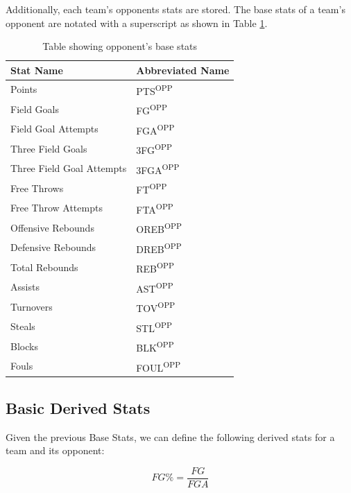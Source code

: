 \documentclass[]{article}
\def\SP#1{\textsuperscript{{#1}}}
\begin{document}
Additionally, each team's opponents stats are stored. The base stats of a team's opponent are notated with a superscript as shown in Table \ref{table:opp_base_stats}. 

\begin{table}[ht]
\centering
\begin{tabular}{@{}ll@{}}
\toprule
Stat Name                 & Abbreviated Name \\ \midrule
Points                    & PTS\SP{OPP}              \\
Field Goals               & FG\SP{OPP}               \\
Field Goal Attempts       & FGA\SP{OPP}              \\
Three Field Goals         & 3FG\SP{OPP}              \\
Three Field Goal Attempts & 3FGA\SP{OPP}             \\
Free Throws               & FT\SP{OPP}               \\
Free Throw Attempts       & FTA\SP{OPP}              \\
Offensive Rebounds        & OREB\SP{OPP}             \\
Defensive Rebounds        & DREB\SP{OPP}             \\
Total Rebounds            & REB\SP{OPP}              \\
Assists                   & AST\SP{OPP}              \\
Turnovers                 & TOV\SP{OPP}              \\
Steals                    & STL\SP{OPP}              \\
Blocks                    & BLK\SP{OPP}              \\
Fouls                     & FOUL\SP{OPP}             \\ \bottomrule
\end{tabular}
\caption{Table showing opponent's base stats}
\label{table:opp_base_stats}
\end{table}

\subsection{Basic Derived Stats}

Given the previous Base Stats, we can define the following derived stats for a team and its opponent:

\begin{equation}
	FG\% = \frac{FG}{FGA}
\end{equation}
\end{document}
